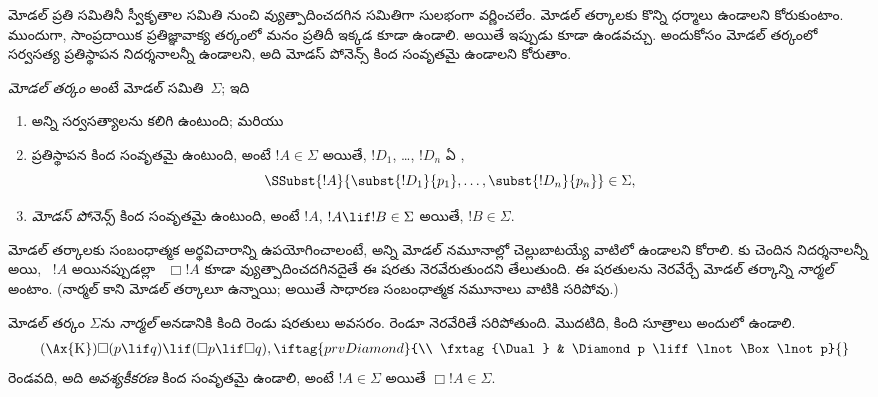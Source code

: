 \documentclass[../../../include/open-logic-section]{subfiles}
\begin{document}


మోడల్  ప్రతి సమితినీ స్వీకృతాల
సమితి నుంచి వ్యుత్పాదించదగిన 
సమితిగా సులభంగా వర్ణించలేం. మోడల్ తర్కాలకు కొన్ని ధర్మాలు ఉండాలని కోరుకుంటాం.
ముందుగా, సాంప్రదాయిక ప్రతిజ్ఞావాక్య తర్కంలో మనం
 ప్రతిదీ ఇక్కడ కూడా
 ఉండాలి. అయితే ఇప్పుడు
కూడా ఉండవచ్చు. అందుకోసం మోడల్ తర్కంలో
సర్వసత్య ప్రతిస్థాపన నిదర్శనాలన్నీ ఉండాలని, అది మోడస్ పోనెన్స్
కింద సంవృతమై ఉండాలని కోరుతాం.

\begin{defn}
  \emph{మోడల్ తర్కం} అంటే మోడల్ 
  సమితి~$\Sigma$; ఇది
  \begin{enumerate}
  \item అన్ని సర్వసత్యాలను కలిగి ఉంటుంది; మరియు
  \item ప్రతిస్థాపన కింద సంవృతమై ఉంటుంది, అంటే $!A \in \Sigma$
    అయితే, $!D_1$, \dots, $!D_n$ ఏ ,
    \[
    \SSubst{!A}{\subst{!D_1}{p_1}, \dots, \subst{!D_n}{p_n}} \in \Sigma,
    \]
    \item \emph{మోడస్ పోనెన్స్} కింద సంవృతమై ఉంటుంది, అంటే
      $!A$, $!A \lif !B \in \Sigma$ అయితే, $!B \in \Sigma$.
  \end{enumerate}
\end{defn}

మోడల్ తర్కాలకు సంబంధాత్మక అర్థవిచారాన్ని ఉపయోగించాలంటే,
అన్ని మోడల్ నమూనాల్లో చెల్లుబాటయ్యే
 వాటిలో ఉండాలని కోరాలి.
కు చెందిన నిదర్శనాలన్నీ 
అయి, ~$!A$
 అయినప్పుడల్లా
~$\Box !A$ కూడా వ్యుత్పాదించదగినదైతే ఈ షరతు నెరవేరుతుందని
తేలుతుంది. ఈ షరతులను నెరవేర్చే మోడల్ తర్కాన్ని
\emph{నార్మల్} అంటాం. (నార్మల్ కాని మోడల్ తర్కాలూ ఉన్నాయి;
అయితే సాధారణ సంబంధాత్మక నమూనాలు వాటికి సరిపోవు.)

\begin{defn}
  మోడల్ తర్కం $\Sigma$ను \emph{నార్మల్} అనడానికి కింది రెండు షరతులు అవసరం. రెండూ నెరవేరితే సరిపోతుంది.
  మొదటిది, కింది సూత్రాలు అందులో ఉండాలి.
  \begin{align*}
    \tag{\Ax{K}} & \Box(p \lif q) \lif (\Box p \lif \Box q),
    \iftag{prvDiamond}{\\
      \tag{\Dual} & \Diamond p \liff \lnot\Box\lnot p}{}
  \end{align*}
  రెండవది, అది \emph{అవశ్యకీకరణ} కింద సంవృతమై ఉండాలి, అంటే
  $!A \in \Sigma$ అయితే $\Box !A \in \Sigma$.
\end{defn}
\end{document}

